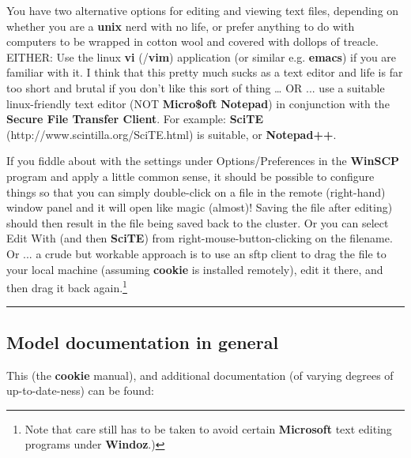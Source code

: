 You have two alternative options for editing and viewing text files, depending on whether you are a \textbf{unix} nerd with no life, or prefer anything to do with computers to be wrapped in cotton wool and covered with dollops of treacle.
EITHER: Use the linux \textbf{vi} (/\textbf{vim}) application (or similar e.g. \textbf{emacs}) if you are familiar with it. I think that this pretty much sucks as a text editor and life is far too short and brutal if you don't like this sort of thing … OR ... use a suitable linux-friendly text editor (NOT \textbf{Micro\$oft} \textbf{Notepad}) in conjunction with the \textbf{Secure File Transfer Client}. For example: \textbf{SciTE} (http://www.scintilla.org/SciTE.html) is suitable, or \textbf{Notepad++}.

If you fiddle about with the settings under Options/Preferences in the \textbf{WinSCP} program and apply a little common sense, it should be possible to configure things so that you can simply double-click on a file in the remote (right-hand) window panel and it will open like magic (almost)! Saving the file after editing) should then result in the file being saved back to the cluster. Or you can select Edit With (and then \textbf{SciTE}) from right-mouse-button-clicking on the filename. Or ... a crude but workable approach is to use an sftp client to drag the file to your local machine (assuming \textbf{cookie} is installed remotely), edit it there, and then drag it back again.\footnote{Note that care still has to be taken to avoid certain \textbf{Microsoft} text editing programs under \textbf{Windoz}.)}

\vspace{1mm}\noindent\rule{4cm}{0.5pt}\vspace{2mm}

\newpage

\subsection*{Model documentation in general}

This (the \textbf{cookie} manual), and additional documentation (of varying degrees of up-to-date-ness) can be found:

